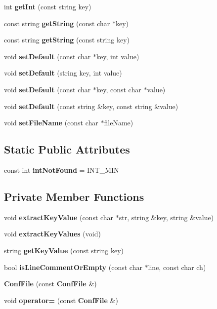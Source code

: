 \begin{CompactItemize}
\item 
int {\bf get\-Int} (const string key)\label{classConfFile_a9}

\item 
const string {\bf get\-String} (const char $\ast$key)\label{classConfFile_a10}

\item 
const string {\bf get\-String} (const string key)\label{classConfFile_a11}

\item 
void {\bf set\-Default} (const char $\ast$key, int value)\label{classConfFile_a12}

\item 
void {\bf set\-Default} (string key, int value)\label{classConfFile_a13}

\item 
void {\bf set\-Default} (const char $\ast$key, const char $\ast$value)\label{classConfFile_a14}

\item 
void {\bf set\-Default} (const string \&key, const string \&value)\label{classConfFile_a15}

\item 
void {\bf set\-File\-Name} (const char $\ast$file\-Name)\label{classConfFile_a16}

\end{CompactItemize}
\subsection*{Static Public Attributes}
\begin{CompactItemize}
\item 
const int {\bf int\-Not\-Found} = INT\_\-MIN\label{classConfFile_s0}

\end{CompactItemize}
\subsection*{Private Member Functions}
\begin{CompactItemize}
\item 
void {\bf extract\-Key\-Value} (const char $\ast$str, string \&key, string \&value)\label{classConfFile_d0}

\item 
void {\bf extract\-Key\-Values} (void)
\item 
string {\bf get\-Key\-Value} (const string key)
\item 
bool {\bf is\-Line\-Comment\-Or\-Empty} (const char $\ast$line, const char ch)
\item 
{\bf Conf\-File} (const {\bf Conf\-File} \&)\label{classConfFile_d4}

\item 
void {\bf operator=} (const {\bf Conf\-File} \&)\label{classConfFile_d5}

\end{CompactItemize}
